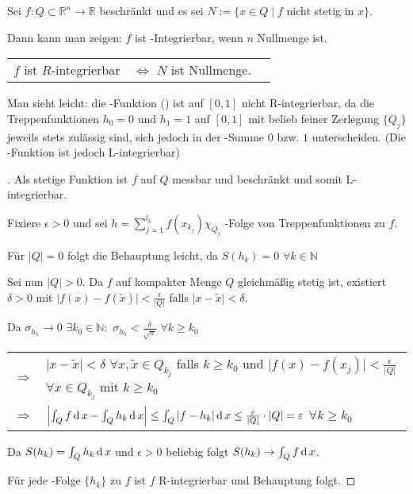 \begin{remark}
	Sei $f:Q\subset\mathbb{R}^n\to\mathbb{R}$ beschränkt und es sei $N:=\{ x\in Q \mid f$ nicht stetig in $x \}$.
	
	Dann kann man zeigen: $f$ ist -Integrierbar, wenn $n$ Nullmenge ist.
	
	\begin{center}
	\begin{tabular}{r@{\ \ }c@{\ \ }l}
		$f$ ist $R$-integrierbar & $\Leftrightarrow$ $N$ ist Nullmenge.
	\end{tabular}
	\end{center}

	Man sieht leicht: die -Funktion () ist auf $[0,1]$ nicht R-integrierbar, da die Treppenfunktionen $h_0 = 0$ und $h_1 = 1$ auf $[0,1]$ mit belieb feiner Zerlegung $\{Q_j\}$ jeweils stets zulässig sind, sich jedoch in der -Summe $0$ bzw. $1$ unterscheiden. (Die -Funktion ist jedoch L-integrierbar)
\end{remark}

\begin{proof}[]
	Als stetige Funktion ist $f$ auf $Q$ messbar und beschränkt und somit L-integrierbar.
	
	Fixiere $\epsilon > 0$ und sei $h=\sum_{j=1}^{l_k} f(x_{k_j}) \chi_{Q_j}$ -Folge von Treppenfunktionen zu $f$.
	
	Für $\vert Q \vert = 0$ folgt die Behauptung leicht, da $S(h_k) = 0$ $\forall k\in\mathbb{N}$
	
	Sei nun $\vert Q \vert > 0$. Da $f$ auf kompakter Menge $Q$ gleichmäßig stetig ist, existiert $\delta > 0$ mit $\vert f(x) - f(\tilde{x})\vert < \frac{\epsilon}{\vert Q \vert}$ falls $\vert x - \tilde{x}\vert < \delta$.
	
	Da $\sigma_{h_k}\to 0$ $\exists k_0\in\mathbb{N}:$ $\sigma_{h_k} < \frac{\delta}{\sqrt{n}}$ $\forall k\ge k_0$ \\
	\begin{tabularx}{\linewidth}{r@{\ \ }X}
	$\Rightarrow$ & $\vert x - \tilde{x}\vert < \delta$ $\forall x,\tilde{x}\in Q_{k_j}$ falls $k\ge k_0$ und $\vert f(x) - f(x_{j})\vert < \frac{\epsilon}{\vert Q \vert}$ $\forall x\in Q_{k_j}$ mit $k\ge k_0$\\
	$\Rightarrow$ & $\left\vert \int_Q f\operatorname{d} x - \int_Q h_k \operatorname{d} x \right\vert \le \int_Q \vert f - h_k\vert \operatorname{d} x \le \frac{\varepsilon}{\vert Q \vert}\cdot \vert Q \vert = \varepsilon$ $\forall k\ge k_0$
	\end{tabularx}
	
	Da $S(h_k) = \int_Q h_k \operatorname{d} x$ und $\epsilon > 0$ beliebig folgt $S(h_k)\to \int_Q f\operatorname{d} x$.
	
	Für jede -Folge $\{h_k\}$ zu $f$ ist $f$ R-integrierbar und Behauptung folgt.
\end{proof}